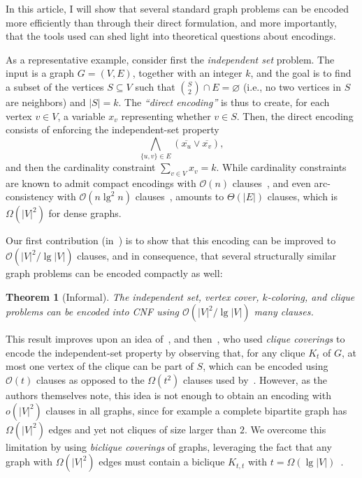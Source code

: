 \documentclass[11pt]{article}
\newtheorem{theorem}{Theorem}
\renewcommand{\O}{\mathcal{O}}
\begin{document}
In this article, I will show that several standard graph problems can be encoded more efficiently than through their direct formulation, and more importantly, that the tools used can shed light into theoretical questions about encodings.

As a representative example, consider first the \emph{independent set} problem.
The input is a graph $G = (V, E)$, together with an integer $k$, and the goal is to find a subset of the vertices $S \subseteq V$ such that  $\binom{S}{2} \cap E = \varnothing$ (i.e., no two vertices in $S$ are neighbors) and $|S| = k$. The \emph{``direct encoding''} is thus to create, for each vertex $v \in V$, a variable $x_v$ representing whether $v \in S$. Then, the direct encoding consists of enforcing the independent-set property
\begin{equation}\label{eq:binaries}
    \bigwedge_{\{u, v\} \in E} (\overline{x_{u}} \lor \overline{x_{v}}), 
\end{equation}
and then the cardinality constraint
\(   
\sum_{v \in V} x_v = k.\)
While cardinality constraints are known to admit compact encodings with $\O(n)$ clauses~\citep{sinzOptimalCNFEncoding2005a}, and even arc-consistency with $\O(n \lg ^2 n)$ clauses~\citep{asinCardinalityNetworksTheoretical2011}, 
 amounts to $\Theta(|E|)$ clauses, which is $\Omega(|V|^2)$ for dense graphs.

Our first contribution (in~) is to show that this encoding can be improved to $\O(|V|^2 / \lg |V|)$ clauses, and in consequence, that several structurally similar graph problems can be encoded compactly as well:

\begin{theorem}[Informal]\label{thm:main}
    The \emph{independent set}, \emph{vertex cover}, \emph{$k$-coloring}, and \emph{clique} problems can be encoded into CNF using $\O(|V|^2 / \lg |V|)$ many clauses.
\end{theorem}

This result improves upon an idea of~\citet{Rintanen}, and then~\citet{ignatievCardinalityEncodingsGraph2017}, who used \emph{clique coverings} to encode the independent-set property by observing that, for any clique $K_t$ of $G$, at most one vertex of the clique can be part of $S$, which can be encoded using $\O(t)$ clauses as opposed to the $\Omega(t^2)$ clauses used by~. 
However, as the authors themselves note, this idea is not enough to obtain an encoding with $o(|V|^2)$ clauses in all graphs, since for example a complete bipartite graph has $\Omega(|V|^2)$ edges and yet not cliques of size larger than $2$.
We overcome this limitation by using \emph{biclique coverings} of graphs, leveraging the fact that any graph with $\Omega(|V|^2)$ edges must contain a biclique $K_{t, t}$ with $t = \Omega(\lg |V|)$~\citep{chungDecompositionGraphsComplete1983}.
\end{document}
